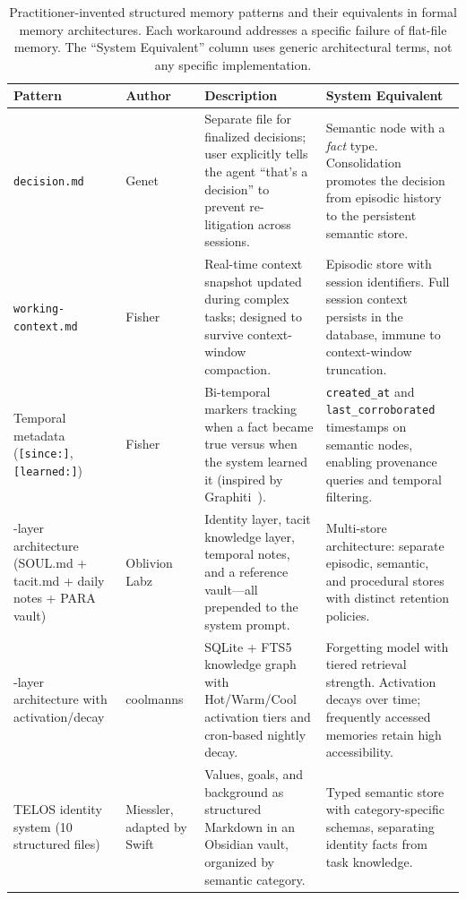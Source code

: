 \begin{table}[!t]
\centering
\caption{Practitioner-invented structured memory patterns and their
equivalents in formal memory architectures.  Each workaround addresses a
specific failure of flat-file memory.  The ``System Equivalent'' column
uses generic architectural terms, not any specific implementation.}
\label{tab:structure-workarounds}
\small
\begin{tabular}{@{}L{3.4cm}L{2.5cm}L{3.7cm}L{3.8cm}@{}}
\toprule
\textbf{Pattern} & \textbf{Author} & \textbf{Description} & \textbf{System Equivalent} \\
\midrule
\texttt{decision.md}
  & Genet~\cite{genet2026}
  & Separate file for finalized decisions; user explicitly tells the
    agent ``that's a decision'' to prevent re-litigation across sessions.
  & Semantic node with a \emph{fact} type.  Consolidation promotes the
    decision from episodic history to the persistent semantic store. \\
\addlinespace
\texttt{working-context.md}
  & Fisher~\cite{fisher2026}
  & Real-time context snapshot updated during complex tasks; designed to
    survive context-window compaction.
  & Episodic store with session identifiers.  Full session context
    persists in the database, immune to context-window truncation. \\
\addlinespace
Temporal metadata (\texttt{[since:]}, \texttt{[learned:]})
  & Fisher~\cite{fisher2026}
  & Bi-temporal markers tracking when a fact became true versus when the
    system learned it (inspired by Graphiti~\cite{dempsey2025graphiti}).
  & \texttt{created\_at} and \texttt{last\_corroborated} timestamps on
    semantic nodes, enabling provenance queries and temporal filtering. \\
-layer architecture (SOUL.md + tacit.md + daily notes + PARA vault)
  & Oblivion Labz
  & Identity layer, tacit knowledge layer, temporal notes, and a
    reference vault---all prepended to the system prompt.
  & Multi-store architecture: separate episodic, semantic, and
    procedural stores with distinct retention policies. \\
-layer architecture with activation/decay
  & coolmanns~\cite{coolmanns2026}
  & SQLite + FTS5 knowledge graph with Hot/Warm/Cool activation tiers
    and cron-based nightly decay.
  & Forgetting model with tiered retrieval strength.  Activation decays
    over time; frequently accessed memories retain high accessibility. \\
\addlinespace
TELOS identity system (10 structured files)
  & Miessler, adapted by Swift
  & Values, goals, and background as structured Markdown in an
    Obsidian vault, organized by semantic category.
  & Typed semantic store with category-specific schemas, separating
    identity facts from task knowledge. \\
\bottomrule
\end{tabular}
\end{table}

